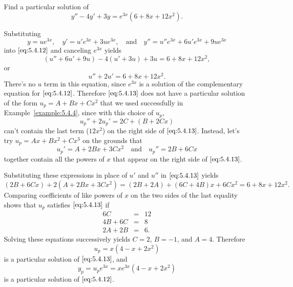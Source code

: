 \documentclass{ximera}
\begin{document}
\begin{example}\label{example:5.4.5}
 Find a particular solution of
\begin{equation} \label{eq:5.4.12}
y''-4y'+3y=e^{3x}(6+8x+12x^2).
\end{equation}
 
\begin{explanation}
Substituting
$$
y=ue^{3x},\quad y'=u'e^{3x}+3ue^{3x},\quad\mbox{and}\quad
y''=u''e^{3x}+6u'e^{3x}+9ue^{3x}
$$
into $\eqref{eq:5.4.12}$ and  canceling $e^{3x}$  yields
$$
(u''+6u'+9u)-4(u'+3u)+3u=6+8x+12x^2,
$$
or
\begin{equation} \label{eq:5.4.13}
u''+2u'=6+8x+12x^2.
\end{equation}
There's no $u$ term in this equation, since $e^{3x}$ is a solution of
the complementary equation for $\eqref{eq:5.4.12}$.
Therefore $\eqref{eq:5.4.13}$ does not have a
particular solution of the form $u_p=A+Bx+Cx^2$ that we used
successfully in Example~\ref{example:5.4.4}, since with this choice of
$u_p$,
$$
u_p''+2u_p'=2C+(B+2Cx)
$$
can't contain the last term ($12x^2$) on the right side of
$\eqref{eq:5.4.13}$. Instead, let's try $u_p=Ax+Bx^2+Cx^3$ on the grounds
that
$$
u_p'=A+2Bx+3Cx^2\quad\mbox{and}\quad
u_p''=2B+6Cx
$$
together contain all the powers of $x$ that appear on the right side
of $\eqref{eq:5.4.13}$.
 
Substituting these expressions in place of $u'$ and $u''$  in
$\eqref{eq:5.4.13}$ yields
$$
(2B+6Cx)+2(A+2Bx+3Cx^2)=(2B+2A)+(6C+4B)x+6Cx^2=6+8x+12x^2.
$$
Comparing coefficients of like powers of $x$ on the two sides of the
last equality shows that $u_p$ satisfies $\eqref{eq:5.4.13}$ if
$$
\begin{array}{rcr}
6C&=&12\\
4B+6C&=&8\\
2A+2B&=&6.
\end{array}
$$
Solving these equations successively yields $C=2$, $B=-1$, and $A=4$.
Therefore
$$
u_p=x(4-x+2x^2)
$$
is a particular solution of  $\eqref{eq:5.4.13}$,
and
$$
y_p=u_pe^{3x}=xe^{3x}(4-x+2x^2)
$$
is a particular solution of  $\eqref{eq:5.4.12}$.
\end{explanation}
\end{example}
 
\end{document}

